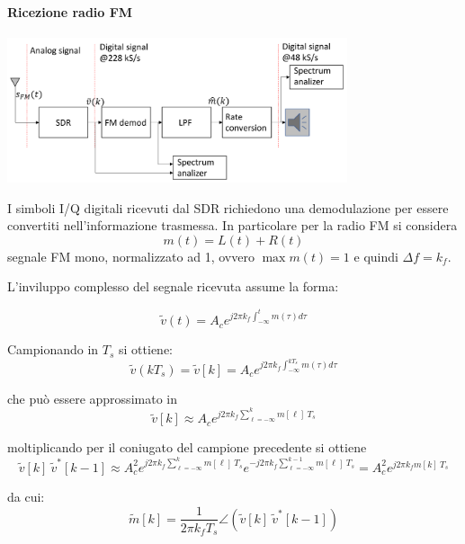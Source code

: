 \paragraph*{Ricezione radio FM}
\begin{center}
    \includegraphics[width=0.75\textwidth]{imgs/fm_receiver_impl.jpg}
\end{center}
I simboli I/Q digitali ricevuti dal SDR richiedono una demodulazione per essere convertiti nell'informazione trasmessa. In particolare per la radio FM si considera
\[
    m(t) = L(t) + R(t)
\]
segnale FM mono, normalizzato ad 1, ovvero $\max{m(t)} = 1$ e quindi $\Delta f = k_f$.


L'inviluppo complesso del segnale ricevuta assume la forma:

\[
    \tilde{v}(t) = A_c e^{j2\pi k_f \int_{-\infty}^{t} m(\tau) d\tau}
\]

Campionando in $T_s$ si ottiene:
\[
    \tilde{v}(kT_s) = \tilde{v}[k] = A_c e^{j2\pi k_f \int_{-\infty}^{kT_s} m(\tau) d\tau}
\]

che può essere approssimato in
\[
    \tilde{v}[k] \approx A_c e^{j2\pi k_f \sum_{\ell = -\infty}^{k} m[\ell] \ T_s}
\]

moltiplicando per il coniugato del campione precedente si ottiene
\[
  \tilde{v}[k] \ \tilde{v}^*[k-1] \approx A_c^2 e^{j2\pi k_f \sum_{\ell = -\infty}^{k} m[\ell] \ T_s} e^{-j2\pi k_f \sum_{\ell = -\infty}^{k-1} m[\ell] \ T_s} = A_c^2 e^{j2\pi k_f m[k] \ T_s}
\]


da cui:
\[
    \tilde{m}[k] = \frac{1}{2\pi k_f T_s} \angle \left( \tilde{v}[k] \ \tilde{v}^*[k-1] \right)
\]

